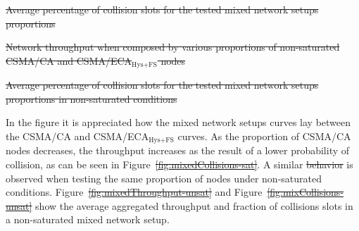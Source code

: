 \documentclass[a4paper,journal]{IEEEtran}
\providecommand{\DIFaddtex}[1]{{\protect\color{blue}\uwave{#1}}} %
\providecommand{\DIFdeltex}[1]{{\protect\color{red}\sout{#1}}}                      %
\providecommand{\DIFaddbegin}{} %
\providecommand{\DIFaddend}{} %
\providecommand{\DIFdelbegin}{} %
\providecommand{\DIFdelend}{} %
\providecommand{\DIFdelFL}[1]{\DIFdel{#1}} %
\providecommand{\DIFadd}[1]{\texorpdfstring{\DIFaddtex{#1}}{#1}} %
\providecommand{\DIFdel}[1]{\texorpdfstring{\DIFdeltex{#1}}{}} %
\begin{document}
	\DIFdelbegin %
{%
\DIFdelFL{Average percentage of collision slots for the tested mixed network setups proportions}}

{%
\DIFdelFL{Network throughput when composed by various proportions of non-saturated CSMA/CA and CSMA/ECA$_{\text{Hys+FS}}$ nodes}}

{%
\DIFdelFL{Average percentage of collision slots for the tested mixed network setups proportions in non-saturated conditions}}

\DIFdelend In the figure it is appreciated how the mixed network setups curves lay between the CSMA/CA and CSMA/ECA$_{\text{Hys+FS}}$ curves. As the proportion of CSMA/CA nodes decreases, the throughput increases as the result of a lower probability of collision, as can be seen in Figure~\DIFdelbegin \DIFdel{\ref{fig:mixedCollisions-sat}}\DIFdelend \DIFaddbegin \DIFadd{\ref{fig:coexResults}b}\DIFaddend . A similar \DIFdelbegin \DIFdel{behavior }\DIFdelend \DIFaddbegin \DIFadd{behaviour }\DIFaddend is observed when testing the same proportion of nodes under non-saturated conditions. Figure~\DIFdelbegin \DIFdel{\ref{fig:mixedThroughput-unsat} }\DIFdelend \DIFaddbegin \DIFadd{\ref{fig:coexResults}c }\DIFaddend and Figure~\DIFdelbegin \DIFdel{\ref{fig:mixCollisions-unsat} }\DIFdelend \DIFaddbegin \DIFadd{\ref{fig:coexResults}d }\DIFaddend show the average aggregated throughput and fraction of collisions slots in a non-saturated mixed network setup.
\end{document}
